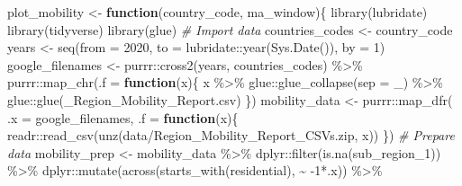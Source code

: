 \documentclass[
]{book}
\newenvironment{Shaded}{\begin{snugshade}}{\end{snugshade}}
\newcommand{\AttributeTok}[1]{\textcolor[rgb]{0.77,0.63,0.00}{#1}}
\newcommand{\CommentTok}[1]{\textcolor[rgb]{0.56,0.35,0.01}{\textit{#1}}}
\newcommand{\ControlFlowTok}[1]{\textcolor[rgb]{0.13,0.29,0.53}{\textbf{#1}}}
\newcommand{\DecValTok}[1]{\textcolor[rgb]{0.00,0.00,0.81}{#1}}
\newcommand{\FunctionTok}[1]{\textcolor[rgb]{0.00,0.00,0.00}{#1}}
\newcommand{\NormalTok}[1]{#1}
\newcommand{\OtherTok}[1]{\textcolor[rgb]{0.56,0.35,0.01}{#1}}
\newcommand{\SpecialCharTok}[1]{\textcolor[rgb]{0.00,0.00,0.00}{#1}}
\newcommand{\StringTok}[1]{\textcolor[rgb]{0.31,0.60,0.02}{#1}}
\begin{document}
\begin{Shaded}
\begin{Highlighting}[]
\NormalTok{plot\_mobility }\OtherTok{\textless{}{-}} \ControlFlowTok{function}\NormalTok{(country\_code, ma\_window)\{}
  \FunctionTok{library}\NormalTok{(lubridate)}
  \FunctionTok{library}\NormalTok{(tidyverse)  }
  \FunctionTok{library}\NormalTok{(glue)}
  \CommentTok{\# Import data}
\NormalTok{  countries\_codes }\OtherTok{\textless{}{-}}\NormalTok{ country\_code}
\NormalTok{  years }\OtherTok{\textless{}{-}} \FunctionTok{seq}\NormalTok{(}\AttributeTok{from =} \DecValTok{2020}\NormalTok{,}
               \AttributeTok{to =}\NormalTok{ lubridate}\SpecialCharTok{::}\FunctionTok{year}\NormalTok{(}\FunctionTok{Sys.Date}\NormalTok{()), }
               \AttributeTok{by =} \DecValTok{1}\NormalTok{)}
\NormalTok{  google\_filenames }\OtherTok{\textless{}{-}} 
\NormalTok{    purrr}\SpecialCharTok{::}\FunctionTok{cross2}\NormalTok{(years, countries\_codes) }\SpecialCharTok{\%\textgreater{}\%} 
\NormalTok{    purrr}\SpecialCharTok{::}\FunctionTok{map\_chr}\NormalTok{(}\AttributeTok{.f =} \ControlFlowTok{function}\NormalTok{(x)\{}
\NormalTok{      x }\SpecialCharTok{\%\textgreater{}\%} 
\NormalTok{        glue}\SpecialCharTok{::}\FunctionTok{glue\_collapse}\NormalTok{(}\AttributeTok{sep =} \StringTok{\textquotesingle{}\_\textquotesingle{}}\NormalTok{) }\SpecialCharTok{\%\textgreater{}\%}
\NormalTok{        glue}\SpecialCharTok{::}\FunctionTok{glue}\NormalTok{(}\StringTok{\textquotesingle{}\_Region\_Mobility\_Report.csv\textquotesingle{}}\NormalTok{)}
\NormalTok{    \})}
\NormalTok{  mobility\_data }\OtherTok{\textless{}{-}} 
\NormalTok{    purrr}\SpecialCharTok{::}\FunctionTok{map\_dfr}\NormalTok{(}
      \AttributeTok{.x =}\NormalTok{ google\_filenames, }
      \AttributeTok{.f =} \ControlFlowTok{function}\NormalTok{(x)\{}
\NormalTok{        readr}\SpecialCharTok{::}\FunctionTok{read\_csv}\NormalTok{(}\FunctionTok{unz}\NormalTok{(}\StringTok{\textquotesingle{}data/Region\_Mobility\_Report\_CSVs.zip\textquotesingle{}}\NormalTok{, x))}
\NormalTok{      \})}
  \CommentTok{\# Prepare data}
\NormalTok{  mobility\_prep }\OtherTok{\textless{}{-}}\NormalTok{ mobility\_data }\SpecialCharTok{\%\textgreater{}\%} 
\NormalTok{    dplyr}\SpecialCharTok{::}\FunctionTok{filter}\NormalTok{(}\FunctionTok{is.na}\NormalTok{(sub\_region\_1)) }\SpecialCharTok{\%\textgreater{}\%}
\NormalTok{    dplyr}\SpecialCharTok{::}\FunctionTok{mutate}\NormalTok{(}\FunctionTok{across}\NormalTok{(}\FunctionTok{starts\_with}\NormalTok{(}\StringTok{\textquotesingle{}residential\textquotesingle{}}\NormalTok{), }\SpecialCharTok{\textasciitilde{}} \SpecialCharTok{{-}}\DecValTok{1}\SpecialCharTok{*}\NormalTok{.x)) }\SpecialCharTok{\%\textgreater{}\%}

\end{Highlighting}
\end{Shaded}
\end{document}
